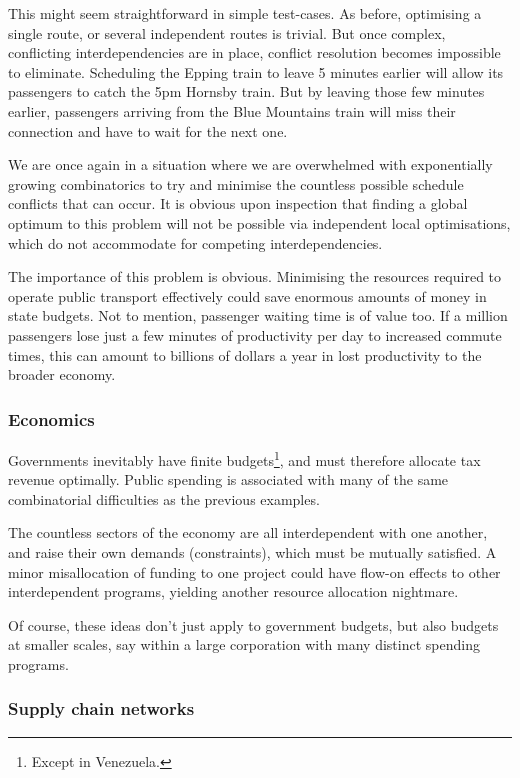 This might seem straightforward in simple test-cases. As before, optimising a single route, or several independent routes is trivial. But once complex, conflicting interdependencies are in place, conflict resolution becomes impossible to eliminate. Scheduling the Epping train to leave 5 minutes earlier will allow its passengers to catch the 5pm Hornsby train. But by leaving those few minutes earlier, passengers arriving from the Blue Mountains train will miss their connection and have to wait for the next one.

We are once again in a situation where we are overwhelmed with exponentially growing combinatorics to try and minimise the countless possible schedule conflicts that can occur. It is obvious upon inspection that finding a global optimum to this problem will not be possible via independent local optimisations, which do not accommodate for competing interdependencies. 

The importance of this problem is obvious. Minimising the resources required to operate public transport effectively could save enormous amounts of money in state budgets. Not to mention, passenger waiting time is of value too. If a million passengers lose just a few minutes of productivity per day to increased commute times, this can amount to billions of dollars a year in lost productivity to the broader economy.

\subsubsection{Economics}

Governments inevitably have finite budgets\footnote{Except in Venezuela.}, and must therefore allocate tax revenue optimally. Public spending is associated with many of the same combinatorial difficulties as the previous examples.

The countless sectors of the economy are all interdependent with one another, and raise their own demands (constraints), which must be mutually satisfied. A minor misallocation of funding to one project could have flow-on effects to other interdependent programs, yielding another resource allocation nightmare.

Of course, these ideas don't just apply to government budgets, but also budgets at smaller scales, say within a large corporation with many distinct spending programs.

\subsubsection{Supply chain networks}

